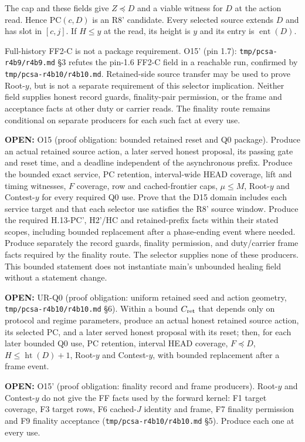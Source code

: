 \documentclass{article}
\newcommand{\OPEN}[1]{\par\noindent\textbf{OPEN:} #1\par}
\newcommand{\nm}[1]{\nolinkurl{#1}}
\begin{document}
The cap and these fields give $Z\preceq D$ and a viable witness
for $D$ at the action read. Hence PC$(c,D)$ is an R8' candidate.
Every selected source extends $D$ and has slot in $[c,j]$.
If $H\leq y$ at the read, its height is $y$ and its entry is
$\operatorname{ent}(D)$.

Full-history FF2-C is not a package requirement.
O15' (pin 1.7): \nm{tmp/pcsa-r4b9/r4b9.md} \S3 refutes the pin-1.6
FF2-C field in a reachable run, confirmed by \nm{tmp/pcsa-r4b10/r4b10.md}.
Retained-side source transfer may be used to prove Root-$y$,
but is not a separate requirement of this selector implication.
Neither field supplies honest record guards, finality-pair permission,
or the frame and acceptance facts at other duty or carrier reads.
The finality route remains conditional on separate producers for
each such fact at every use.

\OPEN{O15 (proof obligation: bounded retained reset and Q0 package).
Produce an actual retained source action, a later served honest
proposal, its passing gate and reset time, and a deadline independent
of the asynchronous prefix. Produce the bounded exact service,
PC retention, interval-wide HEAD coverage, lift and timing witnesses,
$F$ coverage, row and cached-frontier caps, $\mu\leq M$,
Root-$y$ and Contest-$y$ for every required Q0 use.
Prove that the D15 domain includes each service target and that
each selector use satisfies the R8' source window.
Produce the required H.13-PC', H2'/HC and retained-prefix facts
within their stated scopes, including bounded replacement after
a phase-ending event where needed.
Produce separately the record guards, finality permission,
and duty/carrier frame facts required by the finality route.
The selector supplies none of these producers.
This bounded statement does not instantiate main's unbounded
healing field without a statement change.}
\OPEN{UR-Q0 (proof obligation: uniform retained seed and action geometry,
\nm{tmp/pcsa-r4b10/r4b10.md} \S6). Within a bound $C_{\rm ret}$ that
depends only on protocol and regime parameters, produce an actual honest
retained source action, its selected PC, and a later served honest proposal
with its reset; then, for each later bounded Q0 use, PC retention, interval
HEAD coverage, $F\preceq D$, $H\leq\operatorname{ht}(D)+1$, Root-$y$ and
Contest-$y$, with bounded replacement after a frame event.}
\OPEN{O15' (proof obligation: finality record and frame producers).
Root-$y$ and Contest-$y$ do not give the FF facts used by the forward
kernel: F1 target coverage, F3 target rows, F6 cached-$J$ identity and
frame, F7 finality permission and F9 finality acceptance
(\nm{tmp/pcsa-r4b10/r4b10.md} \S5). Produce each one at every use.}
\end{document}
